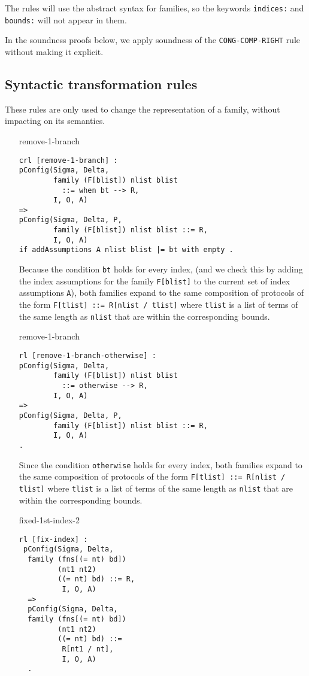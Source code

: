 \documentclass{article}
\begin{document}
The rules will use the abstract syntax for families, so the keywords \texttt{indices:} and \texttt{bounds:} will not appear in them.

In the soundness proofs below, we apply soundness of the 
\texttt{CONG-COMP-RIGHT} rule without making it explicit.

\subsection{Syntactic transformation rules}

These rules are only used to change the representation of a family, without impacting on its semantics.

\begin{itemize}

\item[remove-1-branch]
\begin{lstlisting}
crl [remove-1-branch] :
pConfig(Sigma, Delta, 
        family (F[blist]) nlist blist 
          ::= when bt --> R, 
        I, O, A)
=> 
pConfig(Sigma, Delta, P, 
        family (F[blist]) nlist blist ::= R, 
        I, O, A)
if addAssumptions A nlist blist |= bt with empty . 
\end{lstlisting}

Because the condition \texttt{bt} holds for every index, 
(and we check this by adding the index assumptions for the family
\texttt{F[blist]} to the current set of index assumptions
\texttt{A}),
both families
expand to the same composition of protocols of the form 
\texttt{F[tlist] ::= R[nlist / tlist]} where
\texttt{tlist} is a list of terms of the same length as \texttt{nlist}
that are within the corresponding bounds.

\item[remove-1-branch]
\begin{lstlisting}
rl [remove-1-branch-otherwise] :
pConfig(Sigma, Delta, 
        family (F[blist]) nlist blist 
          ::= otherwise --> R, 
        I, O, A)
=> 
pConfig(Sigma, Delta, P, 
        family (F[blist]) nlist blist ::= R, 
        I, O, A)
. 
\end{lstlisting}

Since the condition \texttt{otherwise} holds for every index, both families
expand to the same composition of protocols of the form 
\texttt{F[tlist] ::= R[nlist / tlist]} where
\texttt{tlist} is a list of terms of the same length as \texttt{nlist}
that are within the corresponding bounds.

\item[fixed-1st-index-2]
\begin{lstlisting}
rl [fix-index] : 
 pConfig(Sigma, Delta, 
  family (fns[(= nt) bd]) 
         (nt1 nt2) 
         ((= nt) bd) ::= R, 
          I, O, A)
  =>
  pConfig(Sigma, Delta, 
  family (fns[(= nt) bd]) 
         (nt1 nt2) 
         ((= nt) bd) ::= 
          R[nt1 / nt], 
          I, O, A)
  .
\end{lstlisting}


\end{itemize}
\end{document}
